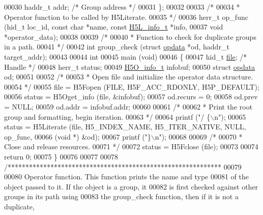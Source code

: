 \begin{DoxyCode}
00030     haddr\_t         addr;           \textcolor{comment}{/* Group address */}
00031 \};
00032 
00033 \textcolor{comment}{/*}
00034 \textcolor{comment}{ * Operator function to be called by H5Literate.}
00035 \textcolor{comment}{ */}
00036 herr\_t op\_func (hid\_t loc\_id, \textcolor{keyword}{const} \textcolor{keywordtype}{char} *name, \textcolor{keyword}{const} \hyperlink{struct_h5_l__info__t}{H5L\_info\_t} *info,
00037             \textcolor{keywordtype}{void} *operator\_data);
00038 
00039 \textcolor{comment}{/*}
00040 \textcolor{comment}{ * Function to check for duplicate groups in a path.}
00041 \textcolor{comment}{ */}
00042 \textcolor{keywordtype}{int} group\_check (\textcolor{keyword}{struct} \hyperlink{structopdata}{opdata} *od, haddr\_t target\_addr);
00043 
00044 \textcolor{keywordtype}{int}
00045 main (\textcolor{keywordtype}{void})
00046 \{
00047     hid\_t           \hyperlink{structfile}{file};           \textcolor{comment}{/* Handle */}
00048     herr\_t          status;
00049     \hyperlink{struct_h5_o__info__t}{H5O\_info\_t}      infobuf;
00050     \textcolor{keyword}{struct }\hyperlink{structopdata}{opdata}   od;
00051 
00052     \textcolor{comment}{/*}
00053 \textcolor{comment}{     * Open file and initialize the operator data structure.}
00054 \textcolor{comment}{     */}
00055     file = H5Fopen (FILE, H5F\_ACC\_RDONLY, H5P\_DEFAULT);
00056     status = H5Oget\_info (file, &infobuf);
00057     od.recurs = 0;
00058     od.prev = NULL;
00059     od.addr = infobuf.addr;
00060 
00061     \textcolor{comment}{/*}
00062 \textcolor{comment}{     * Print the root group and formatting, begin iteration.}
00063 \textcolor{comment}{     */}
00064     printf (\textcolor{stringliteral}{"/ \{\(\backslash\)n"});
00065     status = H5Literate (file, H5\_INDEX\_NAME, H5\_ITER\_NATIVE, NULL, op\_func,
00066                 (\textcolor{keywordtype}{void} *) &od);
00067     printf (\textcolor{stringliteral}{"\}\(\backslash\)n"});
00068 
00069     \textcolor{comment}{/*}
00070 \textcolor{comment}{     * Close and release resources.}
00071 \textcolor{comment}{     */}
00072     status = H5Fclose (file);
00073 
00074     \textcolor{keywordflow}{return} 0;
00075 \}
00076 
00077 
00078 \textcolor{comment}{/************************************************************}
00079 \textcolor{comment}{}
00080 \textcolor{comment}{  Operator function.  This function prints the name and type}
00081 \textcolor{comment}{  of the object passed to it.  If the object is a group, it}
00082 \textcolor{comment}{  is first checked against other groups in its path using}
00083 \textcolor{comment}{  the group\_check function, then if it is not a duplicate,}

\end{DoxyCode}
